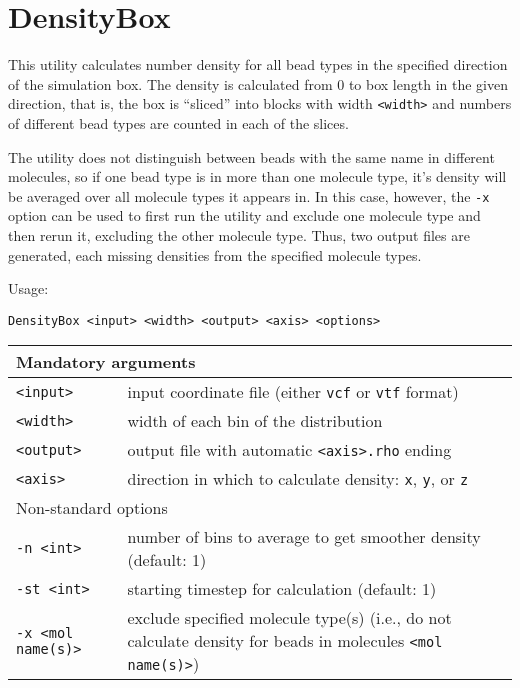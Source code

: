\section{DensityBox} \label{sec:DensityBox}

This utility calculates number density for all bead types in the specified
direction of the simulation box. The density is calculated from 0 to box
length in the given direction, that is, the box is \enquote{sliced} into
blocks with width \texttt{<width>} and numbers of different bead types are
counted in each of the slices.

The utility does not distinguish between beads with the same name in
different molecules, so if one bead type is in more than one molecule type,
it's density will be averaged over all molecule types it appears in. In
this case, however, the \texttt{-x} option can be used to first run the
utility and exclude one molecule type and then rerun it, excluding the
other molecule type. Thus, two output files are generated, each missing
densities from the specified molecule types.

Usage:

\vspace{1em}
\noindent
\texttt{DensityBox <input> <width> <output> <axis> <options>}

\noindent
\begin{longtable}{p{}p{}}
  \toprule
  \multicolumn{2}{l}{Mandatory arguments} \\
  \midrule
  \texttt{<input>} & input coordinate file (either \texttt{vcf} or
    \texttt{vtf} format) \\
  \texttt{<width>} & width of each bin of the distribution \\
  \texttt{<output>} & output file with automatic \texttt{<axis>.rho} ending \\
  \texttt{<axis>} & direction in which to calculate density: \texttt{x},
    \texttt{y}, or \texttt{z} \\
  \toprule
  \multicolumn{2}{l}{Non-standard options} \\
  \midrule
  \texttt{-n <int>} & number of bins to average to get smoother density
    (default: 1) \\
  \texttt{-st <int>} & starting timestep for calculation (default: 1) \\
  \texttt{-x <mol name(s)>} & exclude specified molecule type(s) (i.e., do
    not calculate density for beads in molecules \texttt{<mol name(s)>}) \\
  \bottomrule
\end{longtable}

